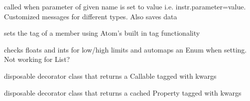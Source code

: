\documentclass[letterpaper,10pt,english]{sphinxmanual}
\begin{document}

\begin{fulllineitems}
\label{core_doc/atom_extension:taref.core.atom_extension.set_log}
called when parameter of given name is set to value i.e. instr.parameter=value. Customized messages for different types. Also saves data

\end{fulllineitems}


\begin{fulllineitems}
\label{core_doc/atom_extension:taref.core.atom_extension.set_tag}
sets the tag of a member using Atom's built in tag functionality

\end{fulllineitems}


\begin{fulllineitems}
\label{core_doc/atom_extension:taref.core.atom_extension.set_value_map}
checks floats and ints for low/high limits and automaps an Enum when setting. Not working for List?

\end{fulllineitems}


\begin{fulllineitems}
\label{core_doc/atom_extension:taref.core.atom_extension.tag_Callable}
disposable decorator class that returns a Callable tagged with kwargs

\end{fulllineitems}


\begin{fulllineitems}
\label{core_doc/atom_extension:taref.core.atom_extension.tag_Property}
disposable decorator class that returns a cached Property tagged with kwargs

\end{fulllineitems}
\end{document}
